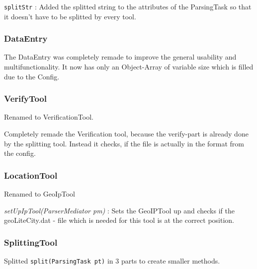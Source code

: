 \texttt{splitStr} : Added the splitted string to the attributes of the ParsingTask so that it doesn't have to be splitted by every tool.

\subsubsection{DataEntry}

The DataEntry was completely remade to improve the general usability and multifunctionality. It now has only an Object-Array of variable size
which is filled due to the Config.

\subsubsection{VerifyTool} 

Renamed to VerificationTool. \newline

Completely remade the Verification tool, because the verify-part is already done by the splitting tool. Instead it checks, if the 
file is actually in the format from the config.

\subsubsection{LocationTool}

Renamed to GeoIpTool\newline

\textit{setUpIpTool(ParserMediator pm)} : Sets the GeoIPTool up and checks if the geoLiteCity.dat - file which is needed for this tool
is at the correct position.

\subsubsection{SplittingTool}

Splitted \texttt{split(ParsingTask pt)} in 3 parts to create smaller methods.


